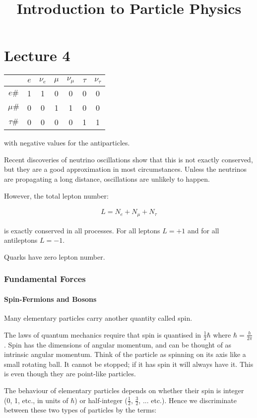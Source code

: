 \documentclass[10pt,a4paper]{article}
\title{Introduction to Particle Physics}
\newcommand{\nue}{\nu_{e}}
\newcommand{\numu}{\nu_{\mu}}
\newcommand{\nutau}{\nu_{\tau}}
\begin{document}
\part*{Lecture 4}

\begin{tabular}{c|c|c|c|c|c|c}
\hline
& $e$ & $\nue$ & $\mu$ & $\numu$ & $\tau$ & $\nutau$ \\
\hline
$e\#$ & 1 & 1 & 0 & 0 & 0 & 0 \\
\hline
$\mu\#$ & 0 & 0 & 1 & 1 & 0 & 0 \\
\hline
$\tau\#$ & 0 & 0 & 0 & 0 & 1 & 1 \\
\hline
\end{tabular}

with negative values for the antiparticles.

Recent discoveries of neutrino oscillations show that this is not exactly conserved, but they are a good approximation in most circumstances. Unless the neutrinos are propagating a long distance, oscillations are unlikely to happen.

However, the total lepton number:

\begin{align*}
L = N_{e} + N_{\mu} + N_{\tau}
\end{align*}

is exactly conserved in all processes. For all leptons $L = +1$ and for all antileptons $L = -1$.

Quarks have zero lepton number.

\section*{Fundamental Forces}

\subsection*{Spin-Fermions and Bosons}

Many elementary particles carry another quantity called spin.

The laws of quantum mechanics require that spin is quantised in $\frac{1}{2}\hbar$ where $\hbar = \frac{h}{2\pi}$. Spin has the dimensions of angular momentum, and can be thought of as intrinsic angular momentum. Think of the particle as spinning on its axis like a small rotating ball. It cannot be stopped; if it has spin it will always have it. This is even though they are point-like particles.

The behaviour of elementary particles depends on whether their spin is integer (0, 1, etc., in units of $\hbar$) or half-integer ($\frac{1}{2}$, $\frac{3}{2}$, ... etc.). Hence we discriminate between these two types of particles by the terms:
\end{document}
